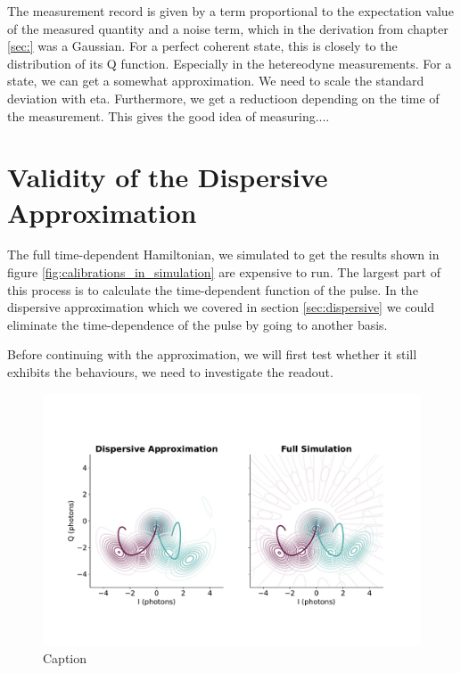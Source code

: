 The measurement record is given by a term proportional to the expectation value of the measured quantity and a noise term, which in the derivation from chapter \ref{sec:} was a Gaussian. For a perfect coherent state, this is closely to the distribution of its Q function. Especially in the hetereodyne measurements. For a state, we can get a somewhat approximation. We need to scale the standard deviation with eta. Furthermore, we get a reductioon depending on the time of the measurement. This gives the good idea of measuring.... 





\section{Validity of the Dispersive Approximation}
The full time-dependent Hamiltonian, we simulated to get the results shown in figure \ref{fig:calibrations_in_simulation} are expensive to run. The largest part of this process is to calculate the time-dependent function of the pulse. In the dispersive approximation which we covered in section \ref{sec:dispersive} we could eliminate the time-dependence of the pulse by going to another basis.

Before continuing with the approximation, we will first test whether it still exhibits the behaviours, we need to investigate the readout. 

\begin{figure}
    \centering
    \includegraphics[width = \textwidth]{Simulations/readout_simulations/figures/dispersive_approx.pdf}
    \caption{Caption}
    \label{fig:enter-label}
\end{figure}

